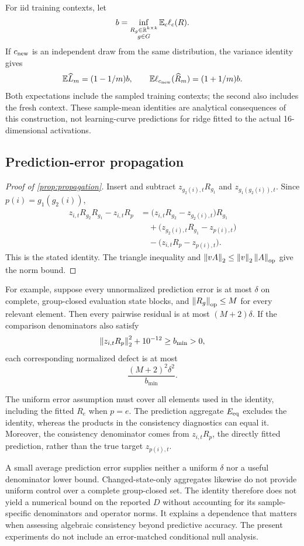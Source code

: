 For iid training contexts, let
\[
 b=
 \inf_{\substack{R_g\in\mathbb{R}^{k\times k}\\g\in G}}
 \mathbb E_c\ell_c(R).
\]
If $c_{\rm new}$ is an independent draw from the same
distribution, the variance identity gives
\[
 \mathbb E\widehat L_m=(1-1/m)b,
 \qquad
 \mathbb E\ell_{c_{\rm new}}(\widehat R_m)
 =(1+1/m)b.
\]
Both expectations include the sampled training contexts;
the second also includes the fresh context.
These sample-mean identities are analytical consequences
of this construction, not learning-curve predictions
for ridge fitted to the actual 16-dimensional activations.


\subsection{Prediction-error propagation}
\label{app:propagation-proof}

\begin{proof}[Proof of \cref{prop:propagation}]
Insert and subtract
$z_{g_2(i),t}R_{g_1}$ and
$z_{g_1(g_2(i)),t}$.
Since $p(i)=g_1(g_2(i))$,
\begin{align*}
 z_{i,t}R_{g_2}R_{g_1}-z_{i,t}R_p
 &=\bigl(z_{i,t}R_{g_2}-z_{g_2(i),t}\bigr)R_{g_1}\\
 &\quad+
 \bigl(z_{g_2(i),t}R_{g_1}-z_{p(i),t}\bigr)\\
 &\quad-
 \bigl(z_{i,t}R_p-z_{p(i),t}\bigr).
\end{align*}
This is the stated identity.
The triangle inequality and
$\left\lVert vA\right\rVert_2\leq\left\lVert v\right\rVert_2\left\lVert A\right\rVert_{\rm op}$
give the norm bound.
\end{proof}

For example, suppose every unnormalized prediction error
is at most $\delta$ on complete, group-closed evaluation
state blocks, and
$\left\lVert R_g\right\rVert_{\rm op}\leq M$ for every relevant element.
Then every pairwise residual is at most
$(M+2)\delta$.
If the comparison denominators also satisfy
\[
 \left\lVert z_{i,t}R_p\right\rVert_2^2+10^{-12}
 \geq b_{\min}>0,
\]
each corresponding normalized defect is at most
\[
 \frac{(M+2)^2\delta^2}{b_{\min}}.
\]

The uniform error assumption must cover all elements
used in the identity, including the fitted $R_e$ when
$p=e$.
The prediction aggregate $E_{\mathrm{eq}}$ excludes the identity,
whereas the products in the consistency diagnostics can
equal it.
Moreover, the consistency denominator comes from
$z_{i,t}R_p$, the directly fitted prediction, rather
than the true target $z_{p(i),t}$.

A small average prediction error supplies neither a
uniform $\delta$ nor a useful denominator lower bound.
Changed-state-only aggregates likewise do not provide
uniform control over a complete group-closed set.
The identity therefore does not yield a numerical bound
on the reported $D$ without accounting for its
sample-specific denominators and operator norms.
It explains a dependence that matters when assessing
algebraic consistency beyond predictive accuracy.
The present experiments do not include an error-matched
conditional null analysis.


